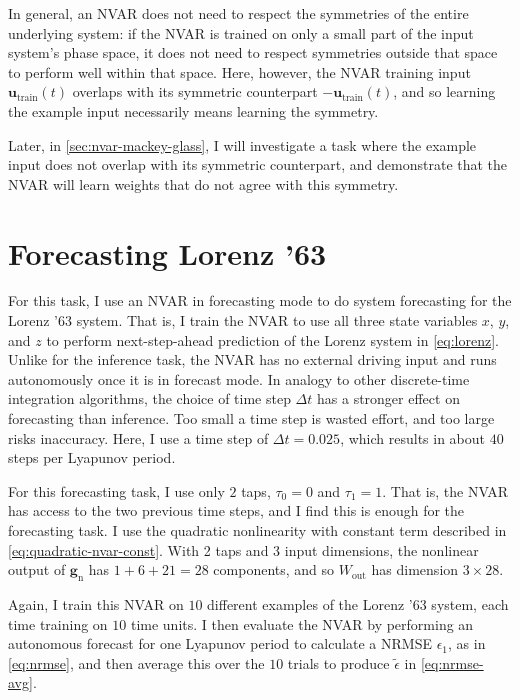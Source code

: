 In general, an NVAR does not need to respect the symmetries of the
entire underlying system: if the NVAR is trained on only a small part
of the input system's phase space, it does not need to respect
symmetries outside that space to perform well within that space. Here,
however, the NVAR training input $\bm{u}_\text{train}(t)$ overlaps
with its symmetric counterpart $-\bm{u}_\text{train}(t)$, and so learning
the example input necessarily means learning the symmetry.

Later, in \cref{sec:nvar-mackey-glass}, I will investigate a task
where the example input does not overlap with its symmetric
counterpart, and demonstrate that the NVAR will learn weights that do
not agree with this symmetry.

\section{Forecasting Lorenz '63}

For this task, I use an NVAR in forecasting mode to do system
forecasting for the Lorenz '63 system. That is, I train the NVAR to
use all three state variables $x$, $y$, and $z$ to perform
next-step-ahead prediction of the Lorenz system in
\cref{eq:lorenz}. Unlike for the inference task, the NVAR has no
external driving input and runs autonomously once it is in forecast
mode. In analogy to other discrete-time integration algorithms, the
choice of time step $\Delta t$ has a stronger effect on forecasting
than inference. Too small a time step is wasted effort, and too large
risks inaccuracy. Here, I use a time step of $\Delta t = 0.025$, which
results in about $40$ steps per Lyapunov period.

For this forecasting task, I use only $2$ taps, $\tau_0 = 0$ and
$\tau_1 = 1$. That is, the NVAR has access to the two previous time
steps, and I find this is enough for the forecasting task.  I use the
quadratic nonlinearity with constant term described in
\cref{eq:quadratic-nvar-const}. With 2 taps and 3 input dimensions,
the nonlinear output of $\bm{g}_\text{n}$ has $1 + 6 + 21 = 28$
components, and so $W_\text{out}$ has dimension $3 \times 28$.

Again, I train this NVAR on $10$ different examples of the Lorenz '63
system, each time training on $10$ time units. I then evaluate the
NVAR by performing an autonomous forecast for one Lyapunov period to
calculate a NRMSE $\epsilon_1$, as in \cref{eq:nrmse}, and then
average this over the $10$ trials to produce $\tilde{\epsilon}$ in
\cref{eq:nrmse-avg}.

